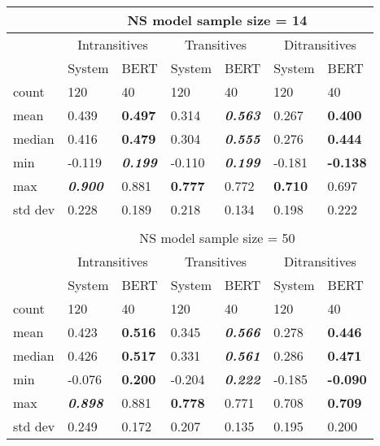 \begin{table}[htb!]
\begin{center}
\begin{tabular}{|l||l|l||l|l||l|l|}
\hline
 & \multicolumn{6}{c|}{NS model sample size = 14} \\
\hline
 & \multicolumn{2}{c||}{Intransitives} & \multicolumn{2}{c||}{Transitives} & \multicolumn{2}{c|}{Ditransitives} \\
\hline
		& System 	& BERT 		& System 	& BERT 		& System 	& BERT 		\\
\hline
\hline
count 	& 120 		& 40 		& 120 		& 40 		& 120 		& 40		 \\
\hline
mean 	& 0.439 	& \textbf{0.497} 	& 0.314 	& \textit{\textbf{0.563}}		& 0.267 	& \textbf{0.400}	 \\
\hline
median 	& 0.416 	& \textbf{0.479} 	& 0.304 	& \textit{\textbf{0.555}}		& 0.276 	& \textbf{0.444}	 \\
\hline
min 	& -0.119 	& \textit{\textbf{0.199}} 	& -0.110 	& \textit{\textbf{0.199}}	& -0.181 	& \textbf{-0.138} \\
\hline
max 	& \textit{\textbf{0.900}} 	& 0.881		& \textbf{0.777} 	& 0.772		& \textbf{0.710} 	& 0.697	 \\
\hline
std dev & 0.228 	& 0.189		& 0.218 	& 0.134		& 0.198 	& 0.222	 \\
\hline
\multicolumn{7}{c}{} \\
\hline
 & \multicolumn{6}{c|}{NS model sample size = 50} \\
\hline
 & \multicolumn{2}{c||}{Intransitives} & \multicolumn{2}{c||}{Transitives} & \multicolumn{2}{c|}{Ditransitives} \\
\hline
		& System 	& BERT 				& System 	& BERT 						& System 	& BERT \\
\hline
\hline
count 	& 120 		& 40 				& 120 		& 40 						& 120 		& 40 	\\
\hline
mean 	& 0.423 	& \textbf{0.516} 	& 0.345 	& \textit{\textbf{0.566}}	& 0.278 	& \textbf{0.446} \\
\hline
median 	& 0.426 	& \textbf{0.517}	& 0.331 	& \textit{\textbf{0.561}}	& 0.286 	& \textbf{0.471} \\
\hline
min 	& -0.076 	& \textbf{0.200}	& -0.204 	& \textit{\textbf{0.222}}	 & -0.185 	& \textbf{-0.090} \\
\hline
max & \textit{\textbf{0.898}} & 0.881	& \textbf{0.778} & 0.771	 			& 0.708 	& \textbf{0.709} \\
\hline
std dev & 0.249 	& 0.172 			& 0.207 	& 0.135 					& 0.195 	& 0.200 \\

\end{tabular}
\end{center}
\end{table}
